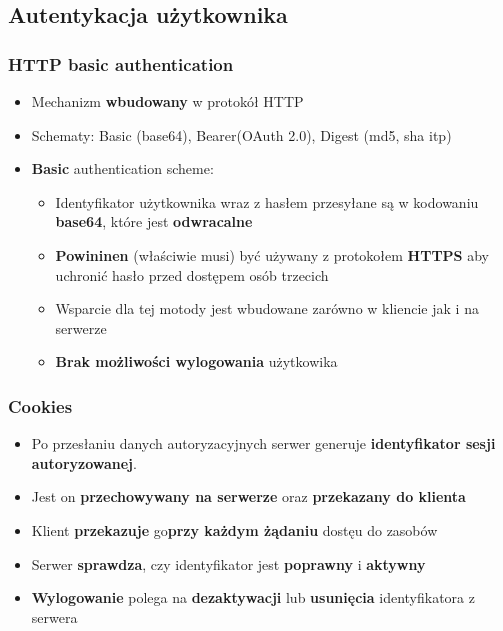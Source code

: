 \documentclass[../main.tex]{subfiles}
\begin{document}
    \subsection{Autentykacja użytkownika}
    \subsubsection{HTTP basic authentication}
    \begin{itemize}
        \item Mechanizm \textbf{wbudowany} w protokół HTTP
        \item Schematy: Basic (base64), Bearer(OAuth 2.0), Digest (md5, sha itp)
        \item \textbf{Basic} authentication scheme:
        \begin{itemize}
            \item Identyfikator użytkownika wraz z hasłem przesyłane są w kodowaniu \textbf{base64}, które jest \textbf{odwracalne}
            \item \textbf{Powininen} (właściwie musi) być używany z protokołem \textbf{HTTPS} aby uchronić hasło przed dostępem osób trzecich
            \item Wsparcie dla tej motody jest wbudowane zarówno w kliencie jak i na serwerze
            \item \textbf{Brak możliwości wylogowania} użytkowika
        \end{itemize}
    \end{itemize}

    \subsubsection{Cookies}
    \begin{itemize}
        \item Po przesłaniu danych autoryzacyjnych serwer generuje \textbf{identyfikator sesji autoryzowanej}.
        \item Jest on \textbf{przechowywany na serwerze} oraz \textbf{przekazany do klienta}
        \item Klient \textbf{przekazuje} go\textbf{przy każdym żądaniu} dostęu do zasobów
        \item Serwer \textbf{sprawdza}, czy identyfikator jest \textbf{poprawny} i \textbf{aktywny}
        \item \textbf{Wylogowanie} polega na \textbf{dezaktywacji} lub \textbf{usunięcia} identyfikatora z serwera
    \end{itemize}
\end{document}
